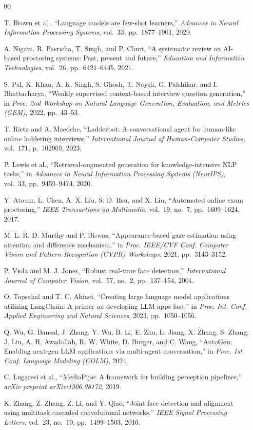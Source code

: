 \documentclass[conference]{IEEEtran}
\begin{document}
\begin{thebibliography}{00}

T. Brown et al., ``Language models are few-shot learners,''
\textit{Advances in Neural Information Processing Systems}, vol.~33,
pp.~1877--1901, 2020.

A. Nigam, R. Pasricha, T. Singh, and P. Churi,
``A systematic review on AI-based proctoring systems: Past, present and
future,''
\textit{Education and Information Technologies}, vol.~26,
pp.~6421--6445, 2021.

S. Pal, K. Khan, A. K. Singh, S. Ghosh, T. Nayak, G. Palshikar, and
I. Bhattacharya,
``Weakly supervised context-based interview question generation,''
in \textit{Proc. 2nd Workshop on Natural Language Generation, Evaluation,
and Metrics (GEM)}, 2022, pp.~43--53.

T. Rietz and A. Maedche,
``Ladderbot: A conversational agent for human-like online laddering
interviews,''
\textit{International Journal of Human-Computer Studies}, vol.~171,
p.~102969, 2023.

P. Lewis et al.,
``Retrieval-augmented generation for knowledge-intensive NLP tasks,''
in \textit{Advances in Neural Information Processing Systems (NeurIPS)},
vol.~33, pp.~9459--9474, 2020.

Y. Atoum, L. Chen, A. X. Liu, S. D. Hsu, and X. Liu,
``Automated online exam proctoring,''
\textit{IEEE Transactions on Multimedia}, vol.~19, no.~7,
pp.~1609--1624, 2017.

M. L. R. D. Murthy and P. Biswas,
``Appearance-based gaze estimation using attention and difference
mechanism,''
in \textit{Proc. IEEE/CVF Conf. Computer Vision and Pattern Recognition
(CVPR) Workshops}, 2021, pp.~3143--3152.

P. Viola and M. J. Jones,
``Robust real-time face detection,''
\textit{International Journal of Computer Vision}, vol.~57, no.~2,
pp.~137--154, 2004.

O. Topsakal and T. C. Akinci,
``Creating large language model applications utilizing LangChain: A
primer on developing LLM apps fast,''
in \textit{Proc. Int. Conf. Applied Engineering and Natural Sciences},
2023, pp.~1050--1056.

Q. Wu, G. Bansal, J. Zhang, Y. Wu, B. Li, E. Zhu, L. Jiang, X. Zhang,
S. Zhang, J. Liu, A. H. Awadallah, R. W. White, D. Burger, and C. Wang,
``AutoGen: Enabling next-gen LLM applications via multi-agent
conversation,''
in \textit{Proc. 1st Conf. Language Modeling (COLM)}, 2024.

C. Lugaresi et al.,
``MediaPipe: A framework for building perception pipelines,''
\textit{arXiv preprint arXiv:1906.08172}, 2019.

K. Zhang, Z. Zhang, Z. Li, and Y. Qiao,
``Joint face detection and alignment using multitask cascaded
convolutional networks,''
\textit{IEEE Signal Processing Letters}, vol.~23, no.~10,
pp.~1499--1503, 2016.

\end{thebibliography}
\end{document}
